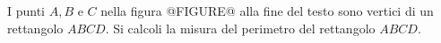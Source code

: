 I punti \(A,B\) e \(C\) nella figura 
@FIGURE@ alla fine del testo
sono vertici di un rettangolo \({ABCD}\).
Si calcoli la misura del perimetro del rettangolo \({ABCD}\). 